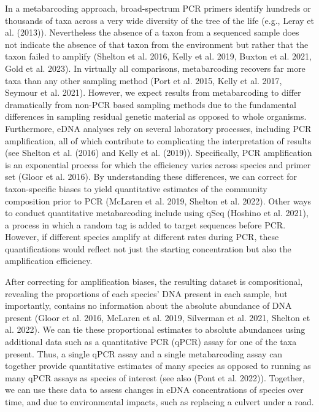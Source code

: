 \documentclass[
]{article}
\begin{document}
In a metabarcoding approach, broad-spectrum PCR primers identify
hundreds or thousands of taxa across a very wide diversity of the tree
of the life (e.g., Leray et al. (2013)). Nevertheless the absence of a
taxon from a sequenced sample does not indicate the absence of that
taxon from the environment but rather that the taxon failed to amplify
(Shelton et al. 2016, Kelly et al. 2019, Buxton et al. 2021, Gold et al.
2023). In virtually all comparisons, metabarcoding recovers far more
taxa than any other sampling method (Port et al. 2015, Kelly et al.
2017, Seymour et al. 2021). However, we expect results from
metabarcoding to differ dramatically from non-PCR based sampling methods
due to the fundamental differences in sampling residual genetic material
as opposed to whole organisms. Furthermore, eDNA analyses rely on
several laboratory processes, including PCR amplification, all of which
contribute to complicating the interpretation of results (see Shelton et
al. (2016) and Kelly et al. (2019)). Specifically, PCR amplification is
an exponential process for which the efficiency varies across species
and primer set (Gloor et al. 2016). By understanding these differences,
we can correct for taxon-specific biases to yield quantitative estimates
of the community composition prior to PCR (McLaren et al. 2019, Shelton
et al. 2022). Other ways to conduct quantitative metabarcoding include
using qSeq (Hoshino et al. 2021), a process in which a random tag is
added to target sequences before PCR. However, if different species
amplify at different rates during PCR, these quantifications would
reflect not just the starting concentration but also the amplification
efficiency.

After correcting for amplification biases, the resulting dataset is
compositional, revealing the proportions of each species' DNA present in
each sample, but importantly, contains no information about the absolute
abundance of DNA present (Gloor et al. 2016, McLaren et al. 2019,
Silverman et al. 2021, Shelton et al. 2022). We can tie these
proportional estimates to absolute abundances using additional data such
as a quantitative PCR (qPCR) assay for one of the taxa present. Thus, a
single qPCR assay and a single metabarcoding assay can together provide
quantitative estimates of many species as opposed to running as many
qPCR assays as species of interest (see also (Pont et al. 2022)).
Together, we can use these data to assess changes in eDNA concentrations
of species over time, and due to environmental impacts, such as
replacing a culvert under a road.
\end{document}
